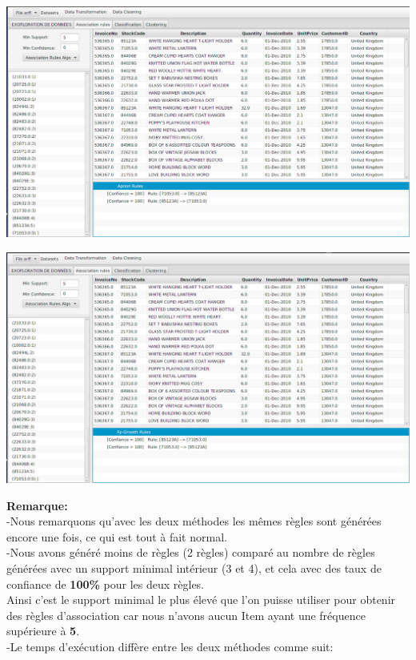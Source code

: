\documentclass[12pt,a4paper,oneside]{book}
\begin{document}
	\begin{frame}{}
		\centering
		\begin{minipage}[b]{0.5\linewidth}
			\includegraphics[width=1\textwidth]{images/apriori_supp5.png}%
			\label{labelname}%
		\end{minipage}
		\hspace{0.5cm}
		\begin{minipage}[b]{0.5\linewidth}
			\includegraphics[width=1\textwidth]{images/fpg_supp5.png}%
			\label{labelname}%
		\end{minipage}
	\end{frame}
	
	
	\textbf{Remarque:}\\
	-Nous remarquons qu'avec les deux méthodes les mêmes règles sont générées encore une fois, ce qui est tout à fait normal.\\
	-Nous avons généré moins de règles (2 règles) comparé au nombre de règles générées avec un support minimal intérieur (3 et 4), et cela avec des taux de confiance de \textbf{ 100\%} pour les deux règles.\\
	Ainsi c'est le support minimal le plus élevé que l'on puisse utiliser pour obtenir des règles d'association car nous n'avons aucun Item ayant une fréquence supérieure à \textbf{5}.\\
	-Le temps d'exécution diffère entre les deux méthodes comme suit:
	
\end{document}
